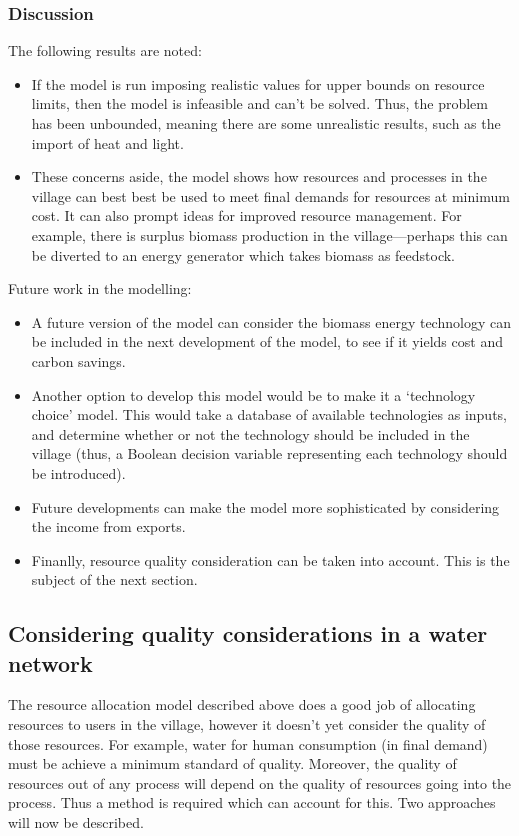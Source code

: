 \subsubsection*{Discussion}
The following results are noted:
\begin{itemize}
	\item If the model is run imposing realistic values for upper bounds on resource limits, then the model is infeasible and can't be solved. Thus, the problem has been unbounded, meaning there are some unrealistic results, such as the import of heat and light. 
	\item These concerns aside, the model shows how resources and processes in the village can best best be used to meet final demands for resources at minimum cost. It can also prompt ideas for improved resource management. For example, there is surplus biomass production in the village---perhaps this can be diverted to an energy generator which takes biomass as feedstock. 
\end{itemize}	
Future work in the modelling:
\begin{itemize}
	\item A future version of the model can consider the biomass energy technology can be included in the next development of the model, to see if it yields cost and carbon savings. 
	\item Another option to develop this model would be to make it a `technology choice' model. This would take a database of available technologies as inputs, and determine whether or not the technology should be included in the village (thus, a Boolean decision variable representing each technology should be introduced).
	\item Future developments can make the model more sophisticated by considering the income from exports.
	\item Finanlly, resource quality consideration can be taken into account. This is the subject of the next section.
\end{itemize}

\subsection{Considering quality considerations in a water network}
The resource allocation model described above does a good job of allocating resources to users in the village, however it doesn't yet consider the quality of those resources. For example, water for human consumption (in final demand) must be achieve a minimum standard of quality. Moreover, the quality of resources out of any process will depend on the quality of resources going into the process. Thus a method is required which can account for this. Two approaches will now be described.

